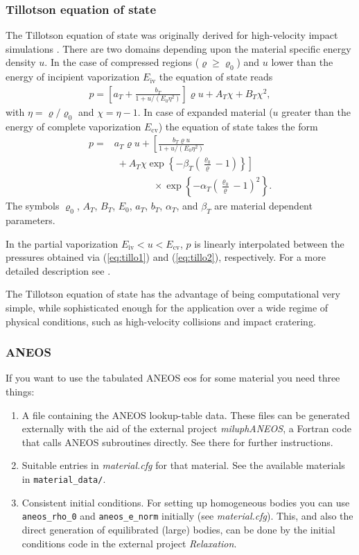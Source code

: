 \documentclass[10pt,fleqn,twoside]{article}
\begin{document}
\subsubsection{Tillotson equation of state}
\label{section:tillotson}
The Tillotson equation of state was originally derived for high-velocity impact simulations \citep{til62}.
There are two domains depending upon the material specific energy density $u$. In the case of compressed regions ($\varrho \geq
\varrho_0$) and $u$ lower than the energy of incipient vaporization $E_\mathrm{iv}$ the equation of state reads
%
\begin{align}\label{eq:tillo1}
p = \left[ a_T + \frac{b_T}{1+u/(E_0 \eta^2)} \right]\varrho u + A_T\chi + B_T\chi^2,
\end{align}
%
with $\eta = \varrho / \varrho_0$ and $\chi = \eta-1$.
In case of expanded material ($u$ greater than the energy of complete vaporization $E_\mathrm{cv}$) the
equation of state takes the form
%
\begin{align}\label{eq:tillo2}
p = & a_T\varrho u +  \left[ \frac{b_T\varrho u}{1+u/(E_0 \eta^2)} \right. \nonumber \\
 & \; + \left. A_T\chi \exp \left\{-\beta_T \left(\frac{\varrho_0}{\varrho}-1\right)\right\} \right] \nonumber \\ & \qquad \qquad
 \times  \exp
 \left\{-\alpha_T\left(\frac{\varrho_0}{\varrho}-1\right)^2\right\}.
\end{align}
%
The symbols $\varrho_0$, $A_T$, $B_T$, $E_0$, $a_T$, $b_T$, $\alpha_T$, and $\beta_T$ are material dependent
parameters.

In the partial vaporization $E_\mathrm{iv} < u < E_\mathrm{cv}$, $p$ is linearly interpolated between the pressures
obtained via (\ref{eq:tillo1}) and (\ref{eq:tillo2}), respectively. For a more detailed description see
\cite{melosh1996impact}.

The Tillotson equation of state has the advantage of being computational very simple, while sophisticated enough for the
application over a wide regime of physical conditions, such as high-velocity collisions and impact cratering.

\subsubsection{ANEOS}
If you want to use the tabulated ANEOS eos for some material you need three things:
\begin{enumerate}
\item A file containing the ANEOS lookup-table data. These files can be generated externally with the aid of the external project \emph{miluphANEOS}, a Fortran code that calls ANEOS subroutines directly. See there for further instructions.
\item Suitable entries in \emph{material.cfg} for that material. See the available materials in \verb|material_data/|.
\item Consistent initial conditions. For setting up homogeneous bodies you can use \verb|aneos_rho_0| and \verb|aneos_e_norm| initially (see \emph{material.cfg}). This, and also the direct generation of equilibrated (large) bodies, can be done by the initial conditions code in the external project \emph{Relaxation}.
\end{enumerate}
\end{document}
